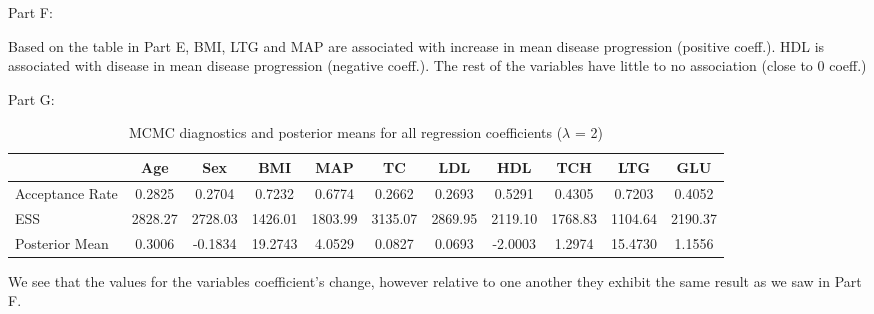 \documentclass[hidelinks]{article}
\begin{document}
\noindent Part F:

\noindent Based on the table in Part E, BMI, LTG and MAP are associated with increase in mean disease progression (positive coeff.). HDL is associated with disease in mean disease progression (negative coeff.). The rest of the variables have little to no association (close to 0 coeff.)

\smallskip

\noindent Part G:

\begin{table}[H]
\centering
\begin{tabular}{lcccccccccc}
\hline
 & \textbf{Age} & \textbf{Sex} & \textbf{BMI} & \textbf{MAP} & \textbf{TC} & \textbf{LDL} & \textbf{HDL} & \textbf{TCH} & \textbf{LTG} & \textbf{GLU} \\
\hline
Acceptance Rate 
& 0.2825 & 0.2704 & 0.7232 & 0.6774 & 0.2662 
& 0.2693 & 0.5291 & 0.4305 & 0.7203 & 0.4052 \\

ESS 
& 2828.27 & 2728.03 & 1426.01 & 1803.99 & 3135.07 
& 2869.95 & 2119.10 & 1768.83 & 1104.64 & 2190.37 \\

Posterior Mean 
& 0.3006 & -0.1834 & 19.2743 & 4.0529 & 0.0827 
& 0.0693 & -2.0003 & 1.2974 & 15.4730 & 1.1556 \\
\hline
\end{tabular}
\caption{MCMC diagnostics and posterior means for all regression coefficients ($\lambda$ = 2)}
\end{table}

\noindent We see that the values for the variables coefficient's change, however relative to one another they exhibit the same result as we saw in Part F.
\end{document}
